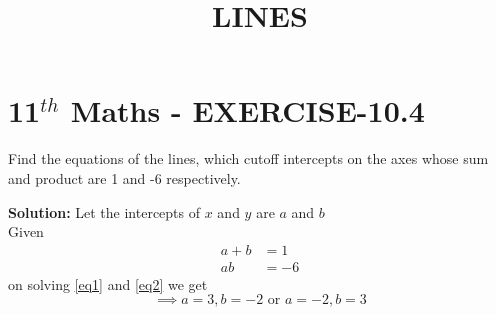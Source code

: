 \documentclass[10pt]{article}
\newcommand{\solution}{\noindent \textbf{Solution: }}
\begin{document}
\begin{center}
\title{\textbf{LINES}}
\date{\vspace{-5ex}} %
\maketitle
\end{center}

\section*{11$^{th}$ Maths - EXERCISE-10.4}

Find the  equations of the lines, which cutoff intercepts on the axes  whose sum and product are 1 and -6 respectively.

\solution
Let the intercepts of $x$ and $y$ are $a$ and $b$\\
Given
\begin{align}
a+b&=1
\label{eq1}\\
ab&=-6
\label{eq2}
\end{align} 
on solving \eqref{eq1} and \eqref{eq2} we get\\
$$\implies a=3,b=-2 \text{ or }   a=-2,b=3$$\\
\end{document}

